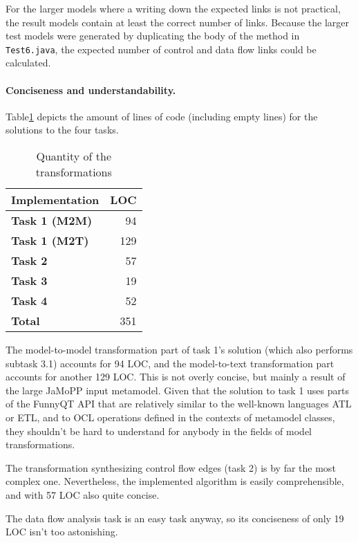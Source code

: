 \documentclass[11pt]{article}
\begin{document}
For the larger models where a writing down the expected links is not practical,
the result models contain at least the correct number of links.  Because the
larger test models were generated by duplicating the body of the method in
\verb|Test6.java|, the expected number of control and data flow links could be
calculated.


\paragraph{Conciseness and understandability.}

Table\ref{tab:eval-quantity} depicts the amount of lines of code (including
empty lines) for the solutions to the four tasks.


\begin{table}[h!]
  \centering
  \begin{tabular}{| l | r |}
    \hline
    \textbf{Implementation} & \textbf{LOC}\\
    \hline
    \textbf{Task 1 (M2M)} & 94\\
    \textbf{Task 1 (M2T)} & 129\\
    \textbf{Task 2} & 57\\
    \textbf{Task 3} & 19\\
    \textbf{Task 4} & 52\\
    \hline
    \textbf{Total} & 351\\
    \hline
  \end{tabular}
  \caption{Quantity of the transformations}
  \label{tab:eval-quantity}
\end{table}

The model-to-model transformation part of task 1's solution (which also
performs subtask 3.1) accounts for 94 LOC, and the model-to-text transformation
part accounts for another 129 LOC.  This is not overly concise, but mainly a
result of the large JaMoPP input metamodel.  Given that the solution to task 1
uses parts of the FunnyQT API that are relatively similar to the well-known
languages ATL or ETL, and to OCL operations defined in the contexts of
metamodel classes, they shouldn't be hard to understand for anybody in the
fields of model transformations.

The transformation synthesizing control flow edges (task 2) is by far the most
complex one.  Nevertheless, the implemented algorithm is easily comprehensible,
and with 57 LOC also quite concise.

The data flow analysis task is an easy task anyway, so its conciseness of only
19 LOC isn't too astonishing.
\end{document}
